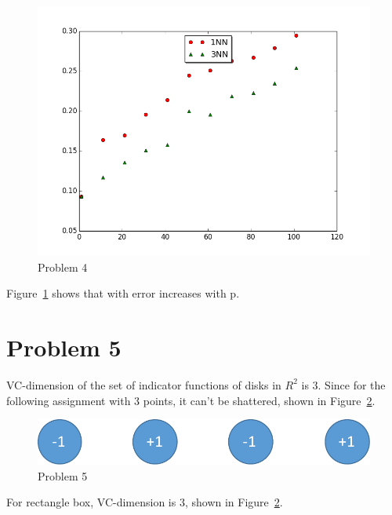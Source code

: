 \documentclass{article}
\begin{document}
\begin{figure}
	\centering
	\includegraphics[width=\textwidth]{p4.png}
	\caption{Problem 4}
	\label{fig:p4}
\end{figure}
Figure~\ref{fig:p4} shows that with error increases with p. 

\section{Problem 5}
VC-dimension of the set of indicator functions of disks in $R^2$ is 3. Since for the following assignment with 3 points, it can't be shattered, shown in Figure~\ref{fig:p51}.
\begin{figure}
	\centering
	\includegraphics[width=\textwidth]{p51}
	\caption{Problem 5}
	\label{fig:p51}
\end{figure}
For rectangle box, VC-dimension is 3, shown in Figure~\ref{fig:p51}. 
\end{document}
